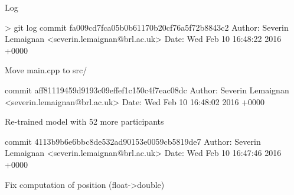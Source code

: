 \documentclass[compress]{beamer}
\begin{document}
\begin{frame}[fragile]{Log}
\begin{shcode}
> git log
commit fa009cd7fca05b0b61170b20cf76a5f72b8843c2
Author: Severin Lemaignan <severin.lemaignan@brl.ac.uk>
Date:   Wed Feb 10 16:48:22 2016 +0000

    Move main.cpp to src/

commit aff81119459d9193c09effef1c150c4f7eac08dc
Author: Severin Lemaignan <severin.lemaignan@brl.ac.uk>
Date:   Wed Feb 10 16:48:02 2016 +0000

    Re-trained model with 52 more participants

commit 4113b9b6e6bbc8de532ad90153e0059cb5819de7
Author: Severin Lemaignan <severin.lemaignan@brl.ac.uk>
Date:   Wed Feb 10 16:47:46 2016 +0000

    Fix computation of position (float->double)
\end{shcode}


\end{frame}

\begin{frame}{}

\centering


\end{frame}
\end{document}
